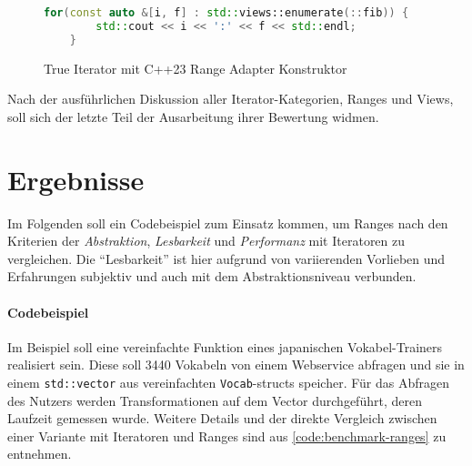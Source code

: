 \documentclass[runningheads]{llncs}
\begin{document}
\begin{figure}[H]
	\caption{True Iterator mit C++23 Range Adapter Konstruktor}
	\label{code:true-iterator-range}
	\begin{lstlisting}[language=C++]
	for(const auto &[i, f] : std::views::enumerate(::fib)) {
		std::cout << i << ':' << f << std::endl;
	}
	\end{lstlisting}

\end{figure}

\noindent Nach der ausführlichen Diskussion aller Iterator-Kategorien, Ranges und Views, soll sich der letzte Teil der Ausarbeitung ihrer Bewertung widmen.

\section{Ergebnisse}


Im Folgenden soll ein Codebeispiel zum Einsatz kommen, um Ranges nach den Kriterien der \textit{Abstraktion}, \textit{Lesbarkeit} und \textit{Performanz} mit Iteratoren zu vergleichen.
Die \enquote{Lesbarkeit} ist hier aufgrund von variierenden Vorlieben und Erfahrungen subjektiv und auch mit dem Abstraktionsniveau verbunden.

\paragraph{Codebeispiel}
Im Beispiel soll eine vereinfachte Funktion eines japanischen Vokabel-Trainers realisiert sein.
Diese soll 3440 Vokabeln von einem Webservice abfragen und sie in einem \texttt{std::vector} aus vereinfachten \texttt{Vocab}-structs speicher.
Für das Abfragen des Nutzers werden Transformationen auf dem Vector durchgeführt, deren Laufzeit gemessen wurde.
Weitere Details und der direkte Vergleich zwischen einer Variante mit Iteratoren und Ranges sind aus \autoref{code:benchmark-ranges} zu entnehmen.
\end{document}
